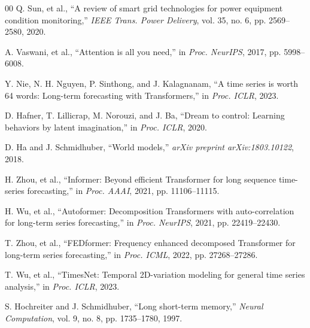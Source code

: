 \documentclass[conference]{IEEEtran}
\begin{document}
\begin{thebibliography}{00}
 Q. Sun, et al., ``A review of smart grid technologies for power equipment condition monitoring,'' \textit{IEEE Trans. Power Delivery}, vol. 35, no. 6, pp. 2569--2580, 2020.

 A. Vaswani, et al., ``Attention is all you need,'' in \textit{Proc. NeurIPS}, 2017, pp. 5998--6008.

 Y. Nie, N. H. Nguyen, P. Sinthong, and J. Kalagnanam, ``A time series is worth 64 words: Long-term forecasting with Transformers,'' in \textit{Proc. ICLR}, 2023.

 D. Hafner, T. Lillicrap, M. Norouzi, and J. Ba, ``Dream to control: Learning behaviors by latent imagination,'' in \textit{Proc. ICLR}, 2020.

 D. Ha and J. Schmidhuber, ``World models,'' \textit{arXiv preprint arXiv:1803.10122}, 2018.

 H. Zhou, et al., ``Informer: Beyond efficient Transformer for long sequence time-series forecasting,'' in \textit{Proc. AAAI}, 2021, pp. 11106--11115.

 H. Wu, et al., ``Autoformer: Decomposition Transformers with auto-correlation for long-term series forecasting,'' in \textit{Proc. NeurIPS}, 2021, pp. 22419--22430.

 T. Zhou, et al., ``FEDformer: Frequency enhanced decomposed Transformer for long-term series forecasting,'' in \textit{Proc. ICML}, 2022, pp. 27268--27286.

 T. Wu, et al., ``TimesNet: Temporal 2D-variation modeling for general time series analysis,'' in \textit{Proc. ICLR}, 2023.

 S. Hochreiter and J. Schmidhuber, ``Long short-term memory,'' \textit{Neural Computation}, vol. 9, no. 8, pp. 1735--1780, 1997.
\end{thebibliography}
\end{document}
